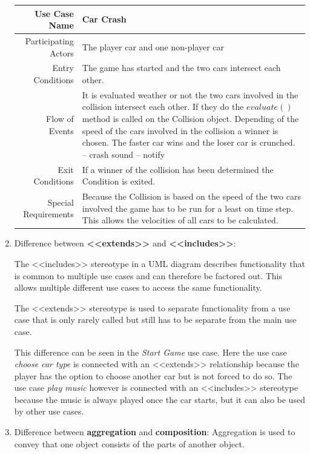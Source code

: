 \documentclass[a4paper, 10pt]{article}
\begin{document}
\begin{enumerate}
    \begin{tabularx}{\linewidth}{ r X }
        \hline
        Use Case Name & Car Crash \\
        \hline
        Participating Actors & The player car and one non-player car \\
        \hline
        Entry Conditions & The game has started and the two cars intersect each other. \\
        \hline
        Flow of Events & 
        It is evaluated weather or not the two cars involved in the collision
        intersect each other. If they do the \( evaluate() \)  method is called on the Collision object. 
        Depending of the speed of the cars involved in the collision a winner is chosen. The faster car wins
        and the loser car is crunched.
        -- crash sound
        -- notify
        \\
        \hline
        Exit Conditions & If a winner of the collision has been determined the Condition is exited. \\
        \hline
        Special Requirements & 
        Because the Collision is based on the speed of the two cars involved the game has to be run for 
        a least on time step. This allows the velocities of all cars to be calculated.
         \\
        \hline
    \end{tabularx}
    \item Difference between \textbf{<<extends>>} and \textbf{<<includes>>}:

        The <<includes>> stereotype in a UML diagram describes functionality that 
        is common to multiple use cases and can therefore be factored out.
        This allows multiple different use cases to access the same functionality.

        The <<extends>> stereotype is used to separate functionality from a use case
        that is only rarely called but still has to be separate from the main use case.

        This difference can be seen in the \textit{Start Game} use case. Here the use case 
        \textit{choose car type} is connected with an <<extends>> relationship because the 
        player has the option to choose another car but is not forced to do so. 
        The use case \textit{play music} however is connected with an <<includes>> stereotype 
        because the music is always played once the car starts, but it can also be used by
        other use cases. 
    \item Difference between \textbf{aggregation} and \textbf{composition}:
        Aggregation is used to convey that one object consists of the parts of another object.


\end{enumerate}
\end{document}
